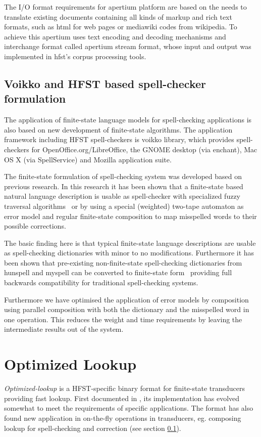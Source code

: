\documentclass{llncs}
\begin{document}
The I/O format requirements for apertium platform are based on the needs to
translate existing documents containing all kinds of markup and rich text
formats, such as html for web pages or mediawiki codes from wikipedia. To
achieve this apertium uses text encoding and decoding mechanisms and
interchange format called apertium stream format, whose input and output
was implemented in hfst's corpus processing tools.

\subsection{Voikko and HFST based spell-checker formulation}\label{spellcheck}

The application of finite-state language models for spell-checking applications
is also based on new development of finite-state algorithms. The application
framework including HFST spell-checkers is voikko library, which provides
spell-checkers for OpenOffice.org/LibreOffice, the GNOME desktop (via
enchant), Mac OS X (via SpellService) and Mozilla application suite.

The finite-state formulation of spell-checking system was developed based on
previous research. In this research it has been shown that a finite-state based
natural language description is usable as spell-checker with specialized fuzzy
traversal algorithms~\cite{oflazer/1996,hulden/2009} or by using a special
(weighted) two-tape automaton as error model and regular finite-state
composition to map misspelled words to their possible
corrections\cite{agata/2002,pirinen/2010/lrec}.
 
The basic finding here is that typical finite-state language descriptions are
usable as spell-checking dictionaries with minor to no modifications.
Furthermore it has been shown that pre-existing non-finite-state spell-checking
dictionaries from hunspell and myspell can be converted to finite-state
form~\cite{pirinen/2010/cla} providing full backwards compatibility for
traditional spell-checking systems.

Furthermore we have optimised the application of error models by composition
using parallel composition with both the dictionary and the misspelled word in
one operation. This reduces the weight and time requirements by leaving the
intermediate results out of the system.

\section{Optimized Lookup}\label{optimized-lookup}
\emph{Optimized-lookup} is a HFST-specific binary format for finite-state
transducers providing fast lookup. First documented in \cite{silfverberg/2009},
its implementation has evolved somewhat to meet the requirements of specific
applications. The format has also found new application in on-the-fly
operations in transducers, eg. composing lookup for spell-checking and
correction (see section \ref{spellcheck}).
\end{document}
